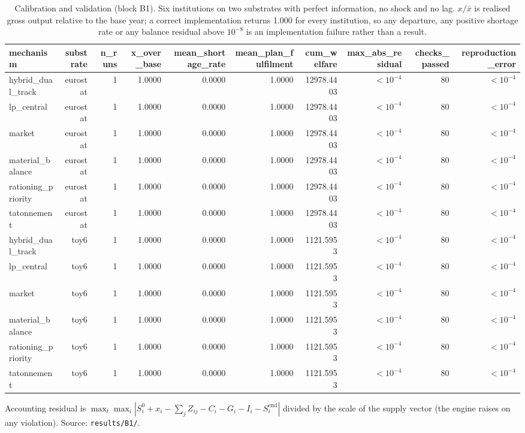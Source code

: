 \begin{table}[htbp]
\centering
\caption{Calibration and validation (block B1). Six institutions on two substrates with perfect information, no shock and no lag. $x/\bar x$ is realised gross output relative to the base year; a correct implementation returns 1.000 for every institution, so any departure, any positive shortage rate or any balance residual above $10^{-8}$ is an implementation failure rather than a result.}
\label{tab:validation}
\begin{tabular}{lrrrrrrrrr}
\toprule
mechanism & substrate & n\_runs & x\_over\_base & mean\_shortage\_rate & mean\_plan\_fulfilment & cum\_welfare & max\_abs\_residual & checks\_passed & reproduction\_error \\
\midrule
hybrid\_dual\_track & eurostat & 1 & 1.0000 & 0.0000 & 1.0000 & 12978.4403 & $<10^{-4}$ & 80 & $<10^{-4}$ \\
lp\_central & eurostat & 1 & 1.0000 & 0.0000 & 1.0000 & 12978.4403 & $<10^{-4}$ & 80 & $<10^{-4}$ \\
market & eurostat & 1 & 1.0000 & 0.0000 & 1.0000 & 12978.4403 & $<10^{-4}$ & 80 & $<10^{-4}$ \\
material\_balance & eurostat & 1 & 1.0000 & 0.0000 & 1.0000 & 12978.4403 & $<10^{-4}$ & 80 & $<10^{-4}$ \\
rationing\_priority & eurostat & 1 & 1.0000 & 0.0000 & 1.0000 & 12978.4403 & $<10^{-4}$ & 80 & $<10^{-4}$ \\
tatonnement & eurostat & 1 & 1.0000 & 0.0000 & 1.0000 & 12978.4403 & $<10^{-4}$ & 80 & $<10^{-4}$ \\
hybrid\_dual\_track & toy6 & 1 & 1.0000 & 0.0000 & 1.0000 & 1121.5953 & $<10^{-4}$ & 80 & $<10^{-4}$ \\
lp\_central & toy6 & 1 & 1.0000 & 0.0000 & 1.0000 & 1121.5953 & $<10^{-4}$ & 80 & $<10^{-4}$ \\
market & toy6 & 1 & 1.0000 & 0.0000 & 1.0000 & 1121.5953 & $<10^{-4}$ & 80 & $<10^{-4}$ \\
material\_balance & toy6 & 1 & 1.0000 & 0.0000 & 1.0000 & 1121.5953 & $<10^{-4}$ & 80 & $<10^{-4}$ \\
rationing\_priority & toy6 & 1 & 1.0000 & 0.0000 & 1.0000 & 1121.5953 & $<10^{-4}$ & 80 & $<10^{-4}$ \\
tatonnement & toy6 & 1 & 1.0000 & 0.0000 & 1.0000 & 1121.5953 & $<10^{-4}$ & 80 & $<10^{-4}$ \\
\bottomrule
\end{tabular}
\par\smallskip
\begin{minipage}{\linewidth}\footnotesize Accounting residual is $\max_t \max_i |S^0_i+x_i-\sum_j Z_{ij}-C_i-G_i-I_i-S^{\mathrm{end}}_i|$ divided by the scale of the supply vector (the engine raises on any violation). Source: \texttt{results/B1/}.\end{minipage}
\end{table}
